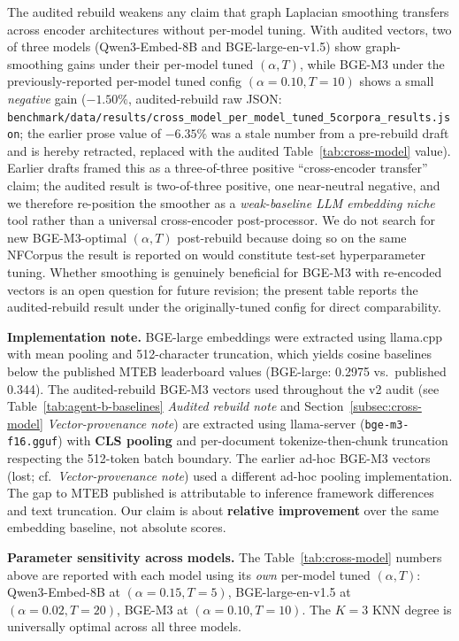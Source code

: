 \documentclass[review,1p]{elsarticle}
\begin{document}
The audited rebuild weakens any claim that graph Laplacian smoothing transfers across encoder architectures without per-model tuning. With audited vectors, two of three models (Qwen3-Embed-8B and BGE-large-en-v1.5) show graph-smoothing gains under their per-model tuned $(\alpha, T)$, while BGE-M3 under the previously-reported per-model tuned config $(\alpha = 0.10, T = 10)$ shows a small \emph{negative} gain ($-1.50\%$, audited-rebuild raw JSON: \texttt{benchmark/data/results/cross\_model\_per\_model\_tuned\_5corpora\_results.json}; the earlier prose value of $-6.35\%$ was a stale number from a pre-rebuild draft and is hereby retracted, replaced with the audited Table~\ref{tab:cross-model} value). Earlier drafts framed this as a three-of-three positive ``cross-encoder transfer'' claim; the audited result is two-of-three positive, one near-neutral negative, and we therefore re-position the smoother as a \emph{weak-baseline LLM embedding niche} tool rather than a universal cross-encoder post-processor. We do not search for new BGE-M3-optimal $(\alpha, T)$ post-rebuild because doing so on the same NFCorpus the result is reported on would constitute test-set hyperparameter tuning. Whether smoothing is genuinely beneficial for BGE-M3 with re-encoded vectors is an open question for future revision; the present table reports the audited-rebuild result under the originally-tuned config for direct comparability.

\textbf{Implementation note.} BGE-large embeddings were extracted using llama.cpp with mean pooling and 512-character truncation, which yields cosine baselines below the published MTEB leaderboard values (BGE-large: 0.2975 vs.\ published 0.344). The audited-rebuild BGE-M3 vectors used throughout the v2 audit (see Table~\ref{tab:agent-b-baselines} \textit{Audited rebuild note} and Section~\ref{subsec:cross-model} \textit{Vector-provenance note}) are extracted using llama-server (\texttt{bge-m3-f16.gguf}) with \textbf{CLS pooling} and per-document tokenize-then-chunk truncation respecting the 512-token batch boundary. The earlier ad-hoc BGE-M3 vectors (lost; cf.\ \textit{Vector-provenance note}) used a different ad-hoc pooling implementation. The gap to MTEB published is attributable to inference framework differences and text truncation. Our claim is about \textbf{relative improvement} over the same embedding baseline, not absolute scores.

\textbf{Parameter sensitivity across models.} The Table~\ref{tab:cross-model} numbers above are reported with each model using its \emph{own} per-model tuned $(\alpha, T)$: Qwen3-Embed-8B at $(\alpha = 0.15, T = 5)$, BGE-large-en-v1.5 at $(\alpha = 0.02, T = 20)$, BGE-M3 at $(\alpha = 0.10, T = 10)$. The $K = 3$ KNN degree is universally optimal across all three models.
\end{document}
